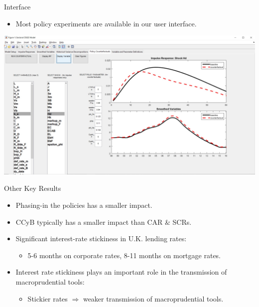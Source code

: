 \documentclass[8pt,aspectratio=169]{beamer}
\numberwithin{equation}{section}
\begin{document}
\begin{frame}{Interface}

\begin{itemize}
\item Most policy experiments are available in our user interface. 
\end{itemize}

\includegraphics[scale=0.3]{gui_screenshot.jpg}


\end{frame}




\begin{frame}{Other Key Results}

\begin{itemize}
\item Phasing-in the policies has a smaller impact. 
\vspace{5 mm}
\item CCyB typically has a smaller impact than CAR \& SCRs. 
\vspace{5 mm}
\item Significant interest-rate stickiness in U.K. lending rates: 
\vspace{2 mm}
\begin{itemize}
\item  5-6 months on corporate rates, 8-11 months on mortgage rates. 
\end{itemize}

\vspace{5 mm}
\item Interest rate stickiness plays an important role in the transmission of macroprudential tools: 
\vspace{2 mm}
\begin{itemize}
\item Stickier rates $\Rightarrow$ weaker transmission of macroprudential tools. 
\end{itemize}
\end{itemize}


\end{frame}
\end{document}
